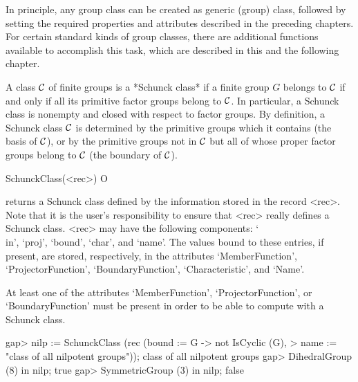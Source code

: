 
In principle, any group class can be created as generic (group) class,
followed by setting the required properties and attributes described in the
preceding chapters. For certain standard kinds of group classes, there are additional
functions available to accomplish this task, which are described in this and the
following chapter.


\null


A class $\cal C$ of finite groups is a *Schunck class* if a finite group
$G$ belongs to $\cal C$ if and only if all its primitive factor groups
belong to $\cal C$. In particular, a Schunck class is nonempty and closed
with respect to factor groups. By definition, a Schunck class $\cal C$ is
determined by the primitive groups which it contains (the basis of $\cal C$),
or by the primitive groups not in $\cal C$ but all of whose proper factor
groups belong to $\cal C$ (the boundary of $\cal C$).

\>SchunckClass(<rec>) O

returns a Schunck class defined by the information stored in the record
<rec>. Note that it is the user's responsibility to ensure that <rec> really
defines a Schunck class. <rec> may have the following components: `\\in',
`proj', `bound', `char', and `name'. The values bound to these entries, if
present, are stored, respectively, in the attributes `MemberFunction', `ProjectorFunction',
`BoundaryFunction', `Characteristic', and `Name'.

At least one of the attributes `MemberFunction', `ProjectorFunction', or
`BoundaryFunction' must be present in order to be able to compute
with a Schunck class. 

\beginexample
gap> nilp := SchunckClass (rec (bound := G -> not IsCyclic (G),
>        name := "class of all nilpotent groups"));
class of all nilpotent groups
gap> DihedralGroup (8) in nilp;
true
gap> SymmetricGroup (3) in nilp;
false
\endexample

